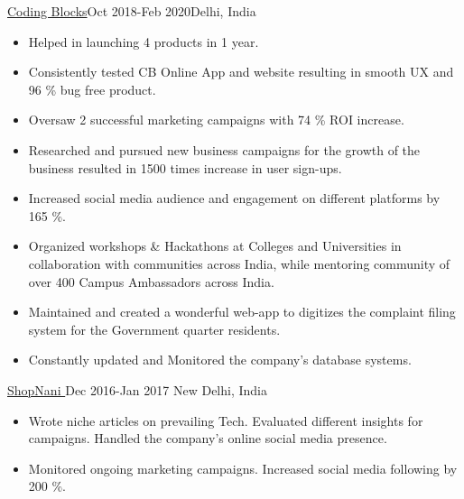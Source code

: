 \documentclass[10pt,a4paper,ragged2e]{altacv}
\begin{document}
 {\color{mecol}\href{https://codingblocks.com}{Coding Blocks}}{Oct 2018-Feb 2020}{Delhi, India}
\begin{itemize}
\item Helped in launching 4 products in 1 year. 
\item Consistently tested CB Online App and website resulting in smooth UX and 96 \% bug free product.
\item Oversaw 2 successful marketing campaigns with 74 \% ROI increase. 
\item Researched and pursued new business campaigns for the growth of the business resulted in 1500 times increase in user sign-ups.
\item Increased social media audience and engagement on different platforms by 165 \%.
\item Organized workshops \& Hackathons at Colleges and Universities in collaboration with communities across India, while mentoring community of over 400 Campus Ambassadors across India.
\end{itemize}

    
\divider

\begin{itemize}
\item Maintained and created a wonderful web-app to digitizes the complaint filing system for the Government quarter residents. 
\item Constantly updated and Monitored the company’s database systems.

\end{itemize}
    
\divider

 {\color{mecol}\href{https://blog.shopnani.com/}{ShopNani }}{Dec 2016-Jan 2017 }{New Delhi, India}

\begin{itemize}
\item Wrote niche articles on  prevailing Tech. Evaluated different insights for campaigns. Handled the company’s online social media presence.
 \item Monitored ongoing marketing campaigns. Increased social media following by 200 \%.

\end{itemize}
\end{document}

